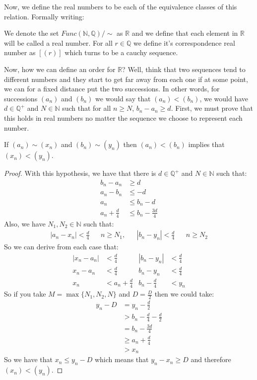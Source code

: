 \documentclass{tufte-handout}
\begin{document}
Now, we define the real numbers to be each of the equivalence classes of this relation. Formally writing:
\begin{definition}
	We denote the set $Func(\mathbb{N}, \mathbb{Q}) / \sim$ as $\mathbb{R}$ and we define that each element in $\mathbb{R}$ will be called a real number. For all $r \in \mathbb{Q}$ we define it's correspondence real number as $[(r)]$ which turns to be a cauchy sequence.
\end{definition}

Now, how we can define an order for $\mathbb{R}$? Well, think that two sequences tend to different numbers and they start to get far away from each one if at some point, we can for a fixed distance put the two successions. In other words, for successions $(a_n)$ and $(b_n)$ we would say that $(a_n) < (b_n)$, we would have $d \in \mathbb{Q}^+$ and $N \in \mathbb{N}$ such that for all $n \ge N$, $b_n - a_n \ge d$. First, we must prove that this holds in real numbers no matter the sequence we choose to represent each number.

\begin{theorem}
	If $(a_n) \sim (x_n)$ and $(b_n) \sim (y_n)$ then $(a_n) < (b_n)$ implies that $(x_n) < (y_n)$.
\end{theorem}
\begin{proof}
	With this hypothesis, we have that there is $d \in \mathbb{Q}^+$ and $N \in \mathbb{N}$ such that:
	\begin{align*}
		b_n - a_n &\ge d\\
		a_n - b_n &\le -d\\
		a_n &\le b_n - d\\
		a_n + \frac{d}{4} &\le b_n - \frac{3d}{4}
	\end{align*}
	Also, we have $N_1, N_2 \in \mathbb{N}$ such that:
	\begin{align*}
		|a_n - x_n| < \frac{d}{4} & &n \ge N_1, & & |b_n - y_n| < \frac{d}{4} && n \ge N_2
	\end{align*}
	So we can derive from each case that:
	\begin{align*}
			|x_n - a_n| &< \frac{d}{4} & |b_n - y_n| &< \frac{d}{4}\\
			x_n - a_n &< \frac{d}{4} & b_n - y_n &< \frac{d}{4}\\
			x_n &< a_n + \frac{d}{4} & b_n - \frac{d}{4} &< y_n
	\end{align*}
	So if you take $M = \max\{N_1, N_2, N\}$ and $D = \frac{D}{2}$ then we could take:
	\begin{align*}
		y_n - D &= y_n - \frac{d}{2}\\
		&> b_n - \frac{d}{4} - \frac{d}{2}\\
		&= b_n - \frac{3d}{4}\\
		&\ge a_n + \frac{d}{4}\\
		&> x_n
	\end{align*}
	So we have that $x_n \le y_n - D$ which means that $y_n - x_n \ge D$ and therefore $(x_n) < (y_n)$.
\end{proof}
\end{document}
